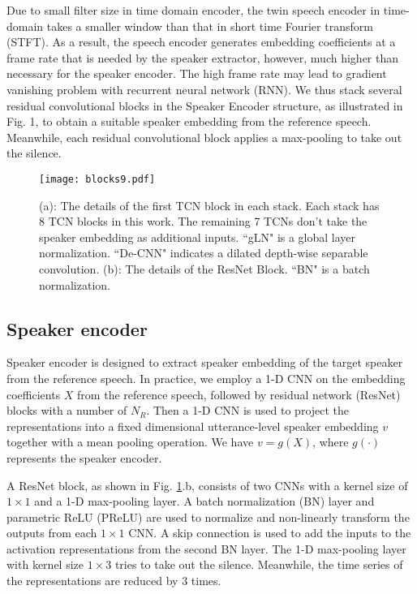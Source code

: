 \documentclass[a4paper]{article}
\begin{document}
Due to small filter size in time domain encoder, the twin speech encoder in time-domain takes a smaller window  than that in short time Fourier transform (STFT). As a result, the speech encoder generates embedding coefficients at a frame rate that is needed by the speaker extractor, however, much higher than necessary for the speaker encoder. The high frame rate may lead to gradient vanishing problem with recurrent neural network (RNN). We thus stack several residual convolutional blocks in the Speaker Encoder structure, as illustrated in Fig. 1, to obtain a suitable speaker embedding from the reference speech. Meanwhile, each residual convolutional block applies a max-pooling to take out the silence.

\begin{figure}[t]
	\centering
	\texttt{[image: blocks9.pdf]}
	\caption{(a): The details of the first TCN block in each stack. Each stack has 8 TCN blocks in this work. The remaining 7 TCNs don't take the speaker embedding as additional inputs. ``gLN" is a global layer normalization. ``De-CNN" indicates a dilated depth-wise separable convolution. (b): The details of the ResNet Block. ``BN" is a batch normalization.}
	\label{fig:blocks}
\end{figure}

\subsection{Speaker encoder}

Speaker encoder is designed to extract speaker embedding of the target speaker from the reference speech. In practice, we employ a 1-D CNN on the embedding coefficients $X$ from the reference speech, followed by residual network (ResNet) blocks with a number of $N_R$. Then a 1-D CNN is used to project the representations into a fixed dimensional utterance-level speaker embedding $v$ together with a mean pooling operation. We have $v = g(X)$, where $g(\cdot)$ represents the speaker encoder. 

A ResNet block, as shown in Fig. \ref{fig:blocks}.b, consists of two CNNs with a kernel size of $1\times 1$ and a 1-D max-pooling layer. A batch normalization (BN) layer and parametric ReLU (PReLU) are used to normalize and non-linearly transform the outputs from each $1\times 1$ CNN. A skip connection is used to add the inputs to the activation representations from the second BN layer. The 1-D max-pooling layer with kernel size $1 \times 3$ tries to take out the silence. Meanwhile, the time series of the representations are reduced by 3 times.
\end{document}
